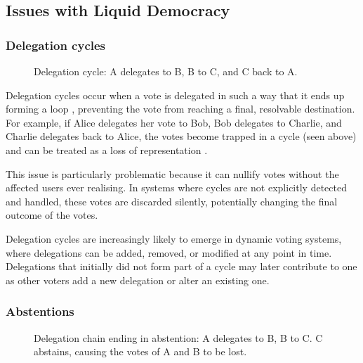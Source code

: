 \subsection{Issues with Liquid Democracy}

\subsubsection{Delegation cycles}
\begin{figure}[h]
    \centering
    \caption{Delegation cycle: A delegates to B, B to C, and C back to A.}
    \label{fig:triangle-cycle}
\end{figure}


Delegation cycles occur when a vote is delegated in such a way that it ends up forming a loop \citep{brill_liquid_2022}, preventing the vote from reaching a final, resolvable destination. For example, if Alice delegates her vote to Bob, Bob delegates to Charlie, and Charlie delegates back to Alice, the votes become trapped in a cycle (seen above) and can be treated as a loss of representation \citep{christoff2017liquiddemocracyanalysisbinary}.

This issue is particularly problematic because it can nullify votes without the affected users ever realising. In systems where cycles are not explicitly detected and handled, these votes are discarded silently, potentially changing the final outcome of the votes.

Delegation cycles are increasingly likely to emerge in dynamic voting systems, where delegations can be added, removed, or modified at any point in time. Delegations that initially did not form part of a cycle may later contribute to one as other voters add a new delegation or alter an existing one.
\subsubsection{Abstentions}
\begin{figure}[h]
    \centering
    \caption{Delegation chain ending in abstention: A delegates to B, B to C. C abstains, causing the votes of A and B to be lost.}
    \label{fig:delegation-abstention}
\end{figure}

